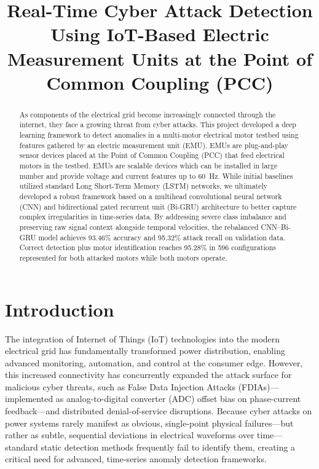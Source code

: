 \documentclass[conference,letterpaper]{IEEEtran}
\begin{document}
\title{Real-Time Cyber Attack Detection Using IoT-Based Electric Measurement Units at the Point of Common Coupling (PCC)}
\author{
}
\maketitle
\raggedbottom


\begin{abstract}
As components of the electrical grid become increasingly connected through the internet, they face a growing threat from cyber attacks. This project developed a deep learning framework to detect anomalies in a multi-motor electrical motor testbed using features gathered by an electric measurement unit (EMU). EMUs are plug-and-play sensor devices placed at the Point of Common Coupling (PCC) that feed electrical motors in the testbed. EMUs are scalable devices which can be installed in large number and provide voltage and current features up to 60~Hz.
While initial baselines utilized standard Long Short-Term Memory (LSTM) networks, we ultimately developed a robust framework based on a multihead convolutional neural network (CNN) and bidirectional gated recurrent unit (Bi-GRU) architecture to better capture complex irregularities in time-series data. By addressing severe class imbalance and preserving raw signal context alongside temporal velocities, the rebalanced CNN--Bi-GRU model achieves 93.46\% accuracy and 95.32\% attack recall on validation data. Correct detection plus motor identification reaches 95.28\% in 596 configurations represented for both attacked motors while both motors operate.
\end{abstract}

\section{Introduction}
The integration of Internet of Things (IoT) technologies into the modern electrical grid has fundamentally transformed power distribution, enabling advanced monitoring, automation, and control at the consumer edge. However, this increased connectivity has concurrently expanded the attack surface for malicious cyber threats, such as False Data Injection Attacks (FDIAs)---implemented as analog-to-digital converter (ADC) offset bias on phase-current feedback---and distributed denial-of-service disruptions. Because cyber attacks on power systems rarely manifest as obvious, single-point physical failures---but rather as subtle, sequential deviations in electrical waveforms over time---standard static detection methods frequently fail to identify them, creating a critical need for advanced, time-series anomaly detection frameworks.
\end{document}
